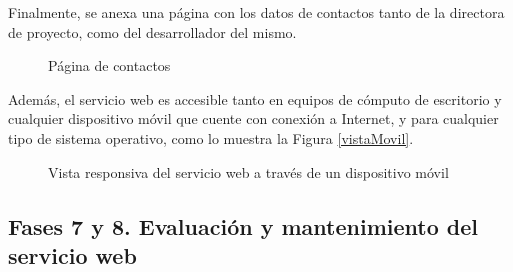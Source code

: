 Finalmente, se anexa una p\'agina con los datos de contactos tanto de la directora de proyecto, como del desarrollador del mismo.\newline

\begin{figure}[!ht]
	\centering
    \caption{P\'agina de contactos}
    \label{paginaContactos}
\end{figure}

Adem\'as, el servicio web es accesible tanto en equipos de c\'omputo de escritorio y cualquier dispositivo m\'ovil que cuente con conexi\'on a Internet, y para cualquier tipo de sistema operativo, como lo muestra la Figura \ref{vistaMovil}.\newline

\begin{figure}[!ht]
	\centering
    \caption{Vista responsiva del servicio web a trav\'es de un dispositivo m\'ovil}
    \label{vistamovil}
\end{figure}



\subsection{Fases 7 y 8. Evaluaci\'on y mantenimiento del servicio web}

